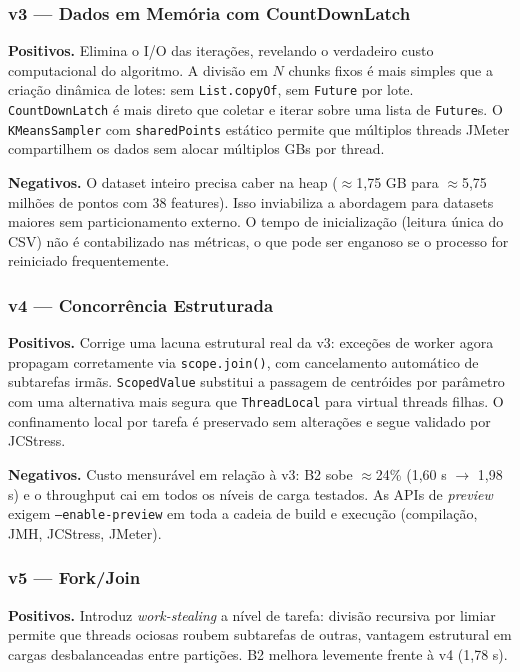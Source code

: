 \subsubsection*{v3 --- Dados em Memória com CountDownLatch}

\textbf{Positivos.}
Elimina o I/O das iterações, revelando o verdadeiro custo computacional do algoritmo.
A divisão em $N$ chunks fixos é mais simples que a criação dinâmica de lotes:
sem \texttt{List.copyOf}, sem \texttt{Future} por lote. \texttt{CountDownLatch}
é mais direto que coletar e iterar sobre uma lista de \texttt{Future}s. O
\texttt{KMeansSampler} com \texttt{sharedPoints} estático permite que múltiplos
threads JMeter compartilhem os dados sem alocar múltiplos GBs por thread.

\textbf{Negativos.}
O dataset inteiro precisa caber na heap ($\approx$1{,}75 GB para $\approx$5{,}75
milhões de pontos com 38 features). Isso inviabiliza a abordagem para datasets
maiores sem particionamento externo. O tempo de inicialização (leitura única do
CSV) não é contabilizado nas métricas, o que pode ser enganoso se o processo for
reiniciado frequentemente.

\subsubsection*{v4 --- Concorrência Estruturada}

\textbf{Positivos.}
Corrige uma lacuna estrutural real da v3: exceções de worker agora propagam
corretamente via \texttt{scope.join()}, com cancelamento automático de
subtarefas irmãs. \texttt{ScopedValue} substitui a passagem de centróides por
parâmetro com uma alternativa mais segura que \texttt{ThreadLocal} para virtual
threads filhas. O confinamento local por tarefa é preservado sem alterações e
segue validado por JCStress.

\textbf{Negativos.}
Custo mensurável em relação à v3: B2 sobe $\approx$24\% (1{,}60 s $\to$
1{,}98 s) e o throughput cai em todos os níveis de carga testados. As APIs de
\textit{preview} exigem \texttt{--enable-preview} em toda a cadeia de build e
execução (compilação, JMH, JCStress, JMeter).

\subsubsection*{v5 --- Fork/Join}

\textbf{Positivos.}
Introduz \textit{work-stealing} a nível de tarefa: divisão recursiva por
limiar permite que threads ociosas roubem subtarefas de outras, vantagem
estrutural em cargas desbalanceadas entre partições. B2 melhora levemente
frente à v4 (1{,}78 s).

